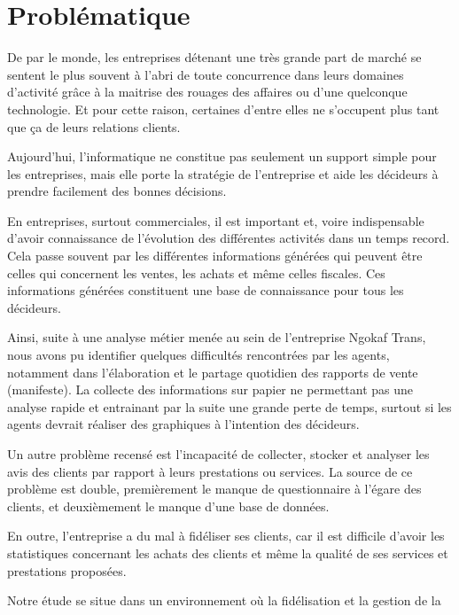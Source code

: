     \section[Problématique]{Problématique}
    De par le monde, les entreprises détenant une très grande part de marché
    se sentent le plus souvent à l’abri de toute concurrence
    dans leurs domaines d’activité grâce à la maitrise des rouages des affaires
    ou d’une quelconque technologie. \cite*{Rouviere2010} Et pour cette raison,
    certaines d’entre elles ne s’occupent plus tant que ça de leurs relations clients.
    \par
    Aujourd’hui, l’informatique ne constitue pas seulement un support simple pour les
    entreprises, mais elle porte la stratégie de l’entreprise et aide les décideurs à prendre
    facilement des bonnes décisions.
    \par
    En entreprises, surtout commerciales, il est important et, voire indispensable
    d’avoir connaissance de l’évolution des différentes activités dans un temps record. Cela
    passe souvent par les différentes informations générées qui peuvent être celles qui
    concernent les ventes, les achats et même celles fiscales. Ces informations générées
    constituent une base de connaissance pour tous les décideurs.
    \par
    Ainsi, suite à une analyse métier menée au sein de l’entreprise Ngokaf Trans,
    nous avons pu identifier quelques difficultés rencontrées par les agents,
    notamment dans l’élaboration et le partage quotidien des rapports de vente (manifeste). 
    La collecte des informations sur papier ne permettant pas une analyse rapide et 
    entrainant par la suite une grande perte de temps, surtout si les agents devrait réaliser
    des graphiques à l’intention des décideurs.
    \par
    Un autre problème recensé est 
    l’incapacité de collecter, stocker et analyser les avis des clients par rapport à leurs prestations
    ou services. La source de ce problème est double, premièrement
    le manque de questionnaire à l’égare des clients, et deuxièmement
    le manque d’une base de données.
    \par
    En outre, l’entreprise a du mal à fidéliser ses clients, car il est difficile d’avoir les
    statistiques concernant les achats des clients et même la qualité de ses services et prestations
    proposées.
    \par
    Notre étude se situe dans un environnement où la fidélisation et la gestion de la
